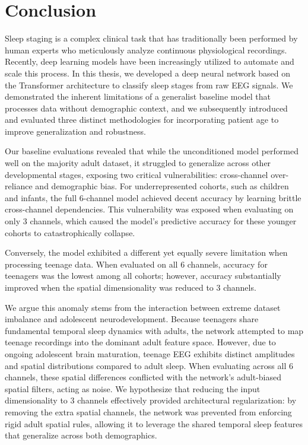 \chapter{Conclusion}

Sleep staging is a complex clinical task that has traditionally been performed by 
human experts who meticulously analyze continuous physiological recordings.
Recently, deep learning models have been increasingly utilized to automate and scale
this process. In this thesis, we developed a deep neural network based on the Transformer
architecture to classify sleep stages from raw EEG signals. We demonstrated the inherent limitations
of a generalist baseline model that processes data without demographic context, and we
subsequently introduced and evaluated three distinct methodologies for incorporating patient age
to improve generalization and robustness.

Our baseline evaluations revealed that while the unconditioned model performed well on the majority
adult dataset, it struggled to generalize across other developmental stages, exposing two critical
vulnerabilities: cross-channel over-reliance and demographic bias. For underrepresented cohorts,
such as children and infants, the full 6-channel model achieved decent accuracy by learning brittle
cross-channel dependencies. This vulnerability was exposed when evaluating on only
3 channels, which caused the model's predictive accuracy for these younger cohorts to catastrophically
collapse.

Conversely, the model exhibited a different yet equally severe limitation when processing teenage data. When evaluated on all 6 channels, accuracy for teenagers was the lowest among all cohorts; however, accuracy substantially improved when the spatial dimensionality was reduced to 3 channels. 

We argue this anomaly stems from the interaction between extreme dataset imbalance and adolescent neurodevelopment. Because teenagers share fundamental temporal sleep dynamics with adults, the network attempted to map teenage recordings into the dominant adult feature space. However, due to ongoing adolescent brain maturation, teenage EEG exhibits distinct amplitudes and spatial distributions compared to adult sleep. When evaluating across all 6 channels, these spatial differences conflicted with the network's adult-biased spatial filters, acting as noise. 
We hypothesize that reducing the input dimensionality to 3 channels effectively provided architectural regularization: by removing the extra spatial channels, the network was prevented from enforcing rigid adult spatial rules, allowing it to leverage the shared temporal sleep features that generalize across both demographics.

